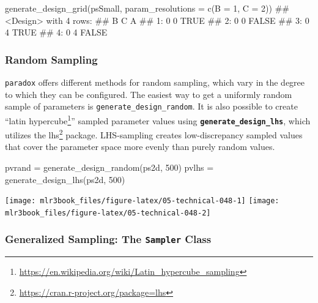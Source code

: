 \documentclass[12pt,]{scrbook}
\newenvironment{Shaded}{}{}
\newcommand{\DataTypeTok}[1]{#1}
\newcommand{\DecValTok}[1]{#1}
\newcommand{\KeywordTok}[1]{\textcolor[rgb]{0.00,0.00,1.00}{#1}}
\newcommand{\NormalTok}[1]{#1}
\newcommand{\StringTok}[1]{\textcolor[rgb]{0.00,0.50,0.50}{#1}}
\renewcommand{\href}[2]{#2\footnote{\url{#1}}}
\begin{document}
\begin{Shaded}
\begin{Highlighting}[]
\KeywordTok{generate_design_grid}\NormalTok{(psSmall, }\DataTypeTok{param_resolutions =} \KeywordTok{c}\NormalTok{(}\DataTypeTok{B =} \DecValTok{1}\NormalTok{, }
  \DataTypeTok{C =} \DecValTok{2}\NormalTok{))}
\NormalTok{## <Design> with 4 rows:}
\NormalTok{##    B C     A}
\NormalTok{## 1: 0 0  TRUE}
\NormalTok{## 2: 0 0 FALSE}
\NormalTok{## 3: 0 4  TRUE}
\NormalTok{## 4: 0 4 FALSE}
\end{Highlighting}
\end{Shaded}

\hypertarget{random-sampling}{%
\subsubsection{Random Sampling}\label{random-sampling}}

\texttt{paradox} offers different methods for random sampling, which vary in the degree to which they can be configured.
The easiest way to get a uniformly random sample of parameters is \texttt{generate\_design\_random}.
It is also possible to create ``\href{https://en.wikipedia.org/wiki/Latin_hypercube_sampling}{latin hypercube}'' sampled parameter values using \textbf{\texttt{generate\_design\_lhs}}, which utilizes the \href{https://cran.r-project.org/package=lhs}{lhs} package.
LHS-sampling creates low-discrepancy sampled values that cover the parameter space more evenly than purely random values.

\begin{Shaded}
\begin{Highlighting}[]
\NormalTok{pvrand =}\StringTok{ }\KeywordTok{generate_design_random}\NormalTok{(ps2d, }\DecValTok{500}\NormalTok{)}
\NormalTok{pvlhs =}\StringTok{ }\KeywordTok{generate_design_lhs}\NormalTok{(ps2d, }\DecValTok{500}\NormalTok{)}
\end{Highlighting}
\end{Shaded}

\texttt{[image: mlr3book\_files/figure-latex/05-technical-048-1]} \texttt{[image: mlr3book\_files/figure-latex/05-technical-048-2]}

\hypertarget{generalized-sampling-the-sampler-class}{%
\subsubsection{\texorpdfstring{Generalized Sampling: The \texttt{Sampler} Class}{Generalized Sampling: The Sampler Class}}\label{generalized-sampling-the-sampler-class}}
\end{document}

